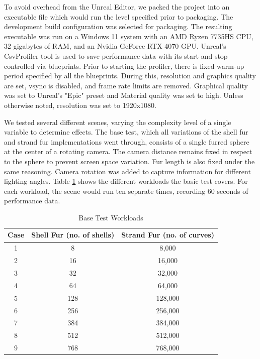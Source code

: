 \documentclass{article}
\begin{document}
To avoid overhead from the Unreal Editor, we packed the project into an executable file which would run the level specified prior to packaging. The development build configuration was selected for packaging. The resulting executable was run on a Windows 11 system with an AMD Ryzen 7735HS CPU, 32 gigabytes of RAM, and an Nvidia GeForce RTX 4070 GPU. Unreal's CsvProfiler tool is used to save performance data with its start and stop controlled via blueprints. Prior to starting the profiler, there is fixed warm-up period specified by all the blueprints. During this, resolution and graphics quality are set, vsync is disabled, and frame rate limits are removed. Graphical quality was set to Unreal's "Epic" preset and Material quality was set to high. Unless otherwise noted, resolution was set to 1920x1080.

We tested several different scenes, varying the complexity level of a single variable to determine effects. The base test, which all variations of the shell fur and strand fur implementations went through, consists of a single furred sphere at the center of a rotating camera. The camera distance remains fixed in respect to the sphere to prevent screen space variation. Fur length is also fixed under the same reasoning. Camera rotation was added to capture information for different lighting angles. Table \ref{table:basic-test} shows the different workloads the basic test covers. For each workload, the scene would run ten separate times, recording 60 seconds of performance data.

\begin{table}[ht]
\caption{Base Test Workloads}
\label{table:basic-test} %
\centering %
\begin{tabular}{c c c} %
\hline\hline %
Case & Shell Fur (no. of shells) & Strand Fur (no. of curves)\\ [0.5ex]
\hline
1 & 8 & 8,000 \\ %
2 & 16 & 16,000 \\
3 & 32 & 32,000 \\
4 & 64 & 64,000 \\
5 & 128 & 128,000 \\ 
6 & 256 & 256,000 \\ 
7 & 384 & 384,000 \\ 
8 & 512 & 512,000 \\ 
9 & 768 & 768,000 \\ [1ex] %
\hline %
\end{tabular}
\end{table}
\end{document}

